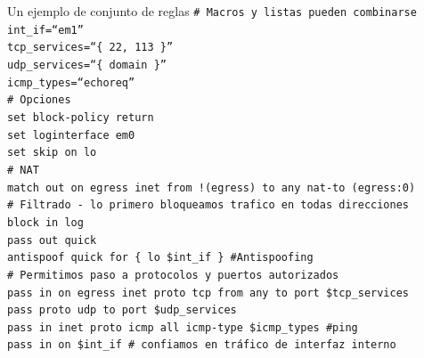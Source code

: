 \documentclass{beamer}
\begin{document}
\begin{frame}

\begin{block}{Un ejemplo de conjunto de reglas}
\footnotesize
\tt \# Macros y listas pueden combinarse \\
\alert{int\_if=``em1''} \\
\alert{tcp\_services=``\{ 22, 113 \}''} \\
\alert{udp\_services=``\{ domain \}''} \\
\alert{icmp\_types=``echoreq''} \\

\# Opciones \\

\alert{set block-policy return} \\
\alert{set loginterface em0} \\
\alert{set skip on lo} \\

\# NAT \\
\alert{match out on egress inet from !(egress) to any nat-to (egress:0)} \\

\# Filtrado - lo primero bloqueamos trafico en todas direcciones \\
\alert{block in log} \\
\alert{pass out quick} \\

\alert{antispoof quick for \{ lo \$int\_if \}} \#Antispoofing \\

\# Permitimos paso a protocolos y puertos autorizados \\
\alert{pass in on egress inet proto tcp from any to port \$tcp\_services} \\   
\alert{pass proto udp to port \$udp\_services} \\

\alert{pass in inet proto icmp all icmp-type \$icmp\_types} \#ping \\

\alert{pass in on \$int\_if} \# confiamos en tráfico de interfaz interno

\end{block}

\end{frame}




\end{document}
